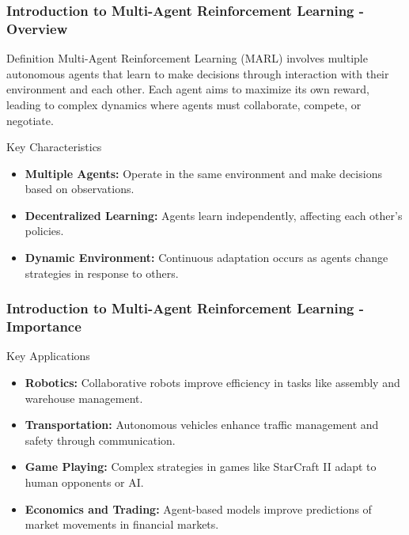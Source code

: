 \documentclass[aspectratio=169]{beamer}
\begin{document}
\frame{\titlepage}

\begin{frame}[fragile]
    \frametitle{Introduction to Multi-Agent Reinforcement Learning - Overview}
    \begin{block}{Definition}
        Multi-Agent Reinforcement Learning (MARL) involves multiple autonomous agents that learn to make decisions through interaction with their environment and each other. Each agent aims to maximize its own reward, leading to complex dynamics where agents must collaborate, compete, or negotiate.
    \end{block}

    \begin{block}{Key Characteristics}
        \begin{itemize}
            \item \textbf{Multiple Agents:} Operate in the same environment and make decisions based on observations.
            \item \textbf{Decentralized Learning:} Agents learn independently, affecting each other's policies.
            \item \textbf{Dynamic Environment:} Continuous adaptation occurs as agents change strategies in response to others.
        \end{itemize}
    \end{block}
\end{frame}

\begin{frame}[fragile]
    \frametitle{Introduction to Multi-Agent Reinforcement Learning - Importance}
    \begin{block}{Key Applications}
        \begin{itemize}
            \item \textbf{Robotics:} Collaborative robots improve efficiency in tasks like assembly and warehouse management.
            \item \textbf{Transportation:} Autonomous vehicles enhance traffic management and safety through communication.
            \item \textbf{Game Playing:} Complex strategies in games like StarCraft II adapt to human opponents or AI.
            \item \textbf{Economics and Trading:} Agent-based models improve predictions of market movements in financial markets.
        \end{itemize}
    \end{block}
\end{frame}
\end{document}
